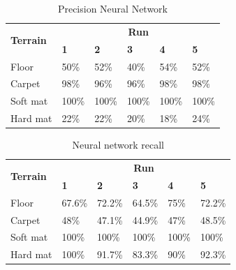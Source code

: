 \documentclass[USenglish]{ifimaster}  %
\begin{document}
	\begin{table}[h]
		\centering
		\begin{tabular}{@{}llllll@{}}
			\toprule
			\multirow{2}{*}{\textbf{Terrain}} & \multicolumn{5}{c}{\textbf{Run}} \\ \cmidrule(l){2-6} 
			& \multicolumn{1}{l|}{\textbf{1}} & \multicolumn{1}{l|}{\textbf{2}} & \multicolumn{1}{l|}{\textbf{3}} & \multicolumn{1}{l|}{\textbf{4}} & \textbf{5} \\ \midrule
			\multicolumn{1}{l|}{Floor} & \multicolumn{1}{l|}{50\%} & \multicolumn{1}{l|}{52\%} & \multicolumn{1}{l|}{40\%} & \multicolumn{1}{l|}{54\%} & 52\% \\ \midrule
			\multicolumn{1}{l|}{Carpet} & \multicolumn{1}{l|}{98\%} & \multicolumn{1}{l|}{96\%} & \multicolumn{1}{l|}{96\%} & \multicolumn{1}{l|}{98\%} & 98\% \\ \midrule
			\multicolumn{1}{l|}{Soft mat} & \multicolumn{1}{l|}{100\%} & \multicolumn{1}{l|}{100\%} & \multicolumn{1}{l|}{100\%} & \multicolumn{1}{l|}{100\%} & 100\% \\ \midrule
			\multicolumn{1}{l|}{Hard mat} & \multicolumn{1}{l|}{22\%} & \multicolumn{1}{l|}{22\%} & \multicolumn{1}{l|}{20\%} & \multicolumn{1}{l|}{18\%} & 24\% \\ \bottomrule
		\end{tabular}
		\caption{Precision Neural Network}
		\label{nnPrecision}
	\end{table}
	\FloatBarrier
	
	\begin{table}[h]
		\centering
		\begin{tabular}{@{}llllll@{}}
			\toprule
			\multirow{2}{*}{\textbf{Terrain}} & \multicolumn{5}{c}{\textbf{Run}} \\ \cmidrule(l){2-6} 
			& \multicolumn{1}{l|}{\textbf{1}} & \multicolumn{1}{l|}{\textbf{2}} & \multicolumn{1}{l|}{\textbf{3}} & \multicolumn{1}{l|}{\textbf{4}} & \textbf{5} \\ \midrule
			\multicolumn{1}{l|}{Floor} & \multicolumn{1}{l|}{67.6\%} & \multicolumn{1}{l|}{72.2\%} & \multicolumn{1}{l|}{64.5\%} & \multicolumn{1}{l|}{75\%} & 72.2\% \\ \midrule
			\multicolumn{1}{l|}{Carpet} & \multicolumn{1}{l|}{48\%} & \multicolumn{1}{l|}{47.1\%} & \multicolumn{1}{l|}{44.9\%} & \multicolumn{1}{l|}{47\%} & 48.5\% \\ \midrule
			\multicolumn{1}{l|}{Soft mat} & \multicolumn{1}{l|}{100\%} & \multicolumn{1}{l|}{100\%} & \multicolumn{1}{l|}{100\%} & \multicolumn{1}{l|}{100\%} & 100\% \\ \midrule
			\multicolumn{1}{l|}{Hard mat} & \multicolumn{1}{l|}{100\%} & \multicolumn{1}{l|}{91.7\%} & \multicolumn{1}{l|}{83.3\%} & \multicolumn{1}{l|}{90\%} & 92.3\% \\ \bottomrule
		\end{tabular}
		\caption{Neural network recall}
		\label{nnrecall}
	\end{table}
	\FloatBarrier
	
\end{document}
